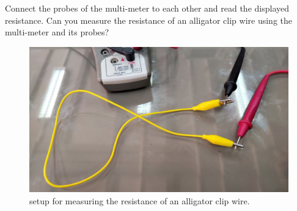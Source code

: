 \documentclass[11pt]{article}
\newcommand{\PicScale}{0.2}
\begin{document}
\begin{question}
\begin{subquestion}{Connect the probes of the multi-meter to each other and read the displayed resistance. Can you measure the resistance of an alligator clip wire using the multi-meter and its probes? }
{            \begin{figure}[H]
                \begin{center}
                    \includegraphics[scale=\PicScale]{Fig/54.jpeg}
                    \caption{setup for measuring the resistance of an alligator clip wire.}
                \end{center}
            \end{figure}

        }
    \end{subquestion}

\end{question}


\end{document}
